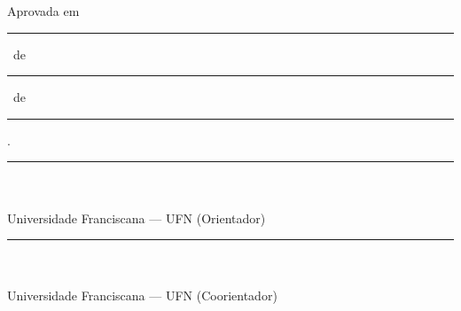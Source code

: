 %
%

\begin{folhadeaprovacao}
    \begin{center}
        {\ABNTEXchapterfont\large\MakeUppercase{\imprimirautor}}

        \vspace*{\onelineskip}\vspace*{\onelineskip}

        {\ABNTEXchapterfont\bfseries\Large\MakeUppercase{\imprimirtitulo}}

        \vspace*{\onelineskip}\vspace*{\onelineskip}
    \end{center}

    \noindent\hspace{.45\textwidth}%
    \begin{minipage}{.5\textwidth}
        \imprimirpreambulo
    \end{minipage}

    \vspace*{\onelineskip}\vspace*{\onelineskip}

    \begin{center}
        Aprovada em \rule{2em}{0.4pt}\ de \rule{6em}{0.4pt}\ de \rule{3em}{0.4pt}.
    \end{center}

    \vspace*{\onelineskip}\vspace*{\onelineskip}

    \noindent\rule{\textwidth}{0.4pt}\\
    \noindent\imprimirorientador\\
    \noindent Universidade Franciscana --- UFN (Orientador)

    \vspace*{\onelineskip}\vspace*{\onelineskip}

    \noindent\rule{\textwidth}{0.4pt}\\
    \noindent\imprimircoorientador\\
    \noindent Universidade Franciscana --- UFN (Coorientador)


\end{folhadeaprovacao}
